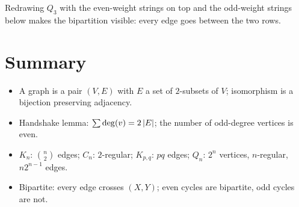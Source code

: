 Redrawing $Q_3$ with the even-weight strings on top and the odd-weight strings below makes the
bipartition visible: every edge goes between the two rows.
\begin{center}
\end{center}

\section{Summary}
\begin{itemize}
  \item A graph is a pair $(V,E)$ with $E$ a set of $2$-subsets of $V$; isomorphism is a
        bijection preserving adjacency.
  \item Handshake lemma: $\sum\deg(v) = 2\left\lvert E \right\rvert$; the number of odd-degree vertices is even.
  \item $K_n$: $\binom n2$ edges; $C_n$: $2$-regular; $K_{p,q}$: $pq$ edges; $Q_n$: $2^n$ vertices,
        $n$-regular, $n2^{n-1}$ edges.
  \item Bipartite: every edge crosses $(X,Y)$; even cycles are bipartite, odd cycles are not.
\end{itemize}
